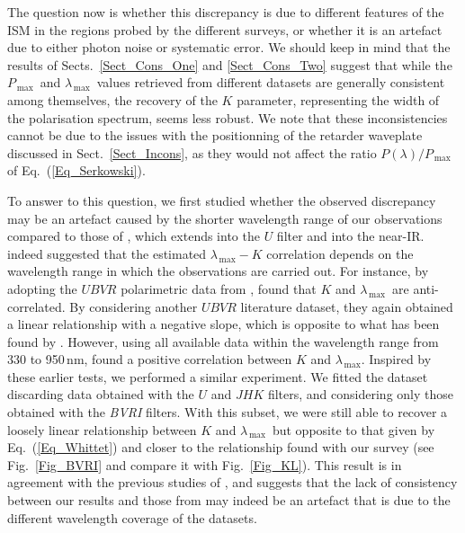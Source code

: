 \documentclass[a4paper]{aa}
\newcommand{\pl}{\ensuremath{P}}
\newcommand{\lmax}{\ensuremath{\lambda_\mathrm{\,max}}}
\newcommand{\pmax}{\ensuremath{P_\mathrm{\,max}}}
\begin{document}
The question now is whether this discrepancy is due to different
features of the ISM in the regions probed by the different surveys, or
whether it is an artefact due to either photon noise or systematic
error. We should keep in mind that the results of Sects.~\ref{Sect_Cons_One}
and \ref{Sect_Cons_Two} suggest that while the \pmax\ and
\lmax\ values retrieved from different datasets are generally
consistent among themselves, the recovery of the $K$ parameter,
representing the width of the polarisation spectrum, seems
less robust. We note that these inconsistencies cannot be due to the
issues with the positionning of the retarder waveplate discussed in
Sect.~\ref{Sect_Incons}, as they would not
affect the ratio $\pl(\lambda)/\pmax$ of Eq.~(\ref{Eq_Serkowski}).

To answer to this question, we first studied whether the observed
discrepancy may be an artefact caused by the shorter wavelength range of our observations compared to those of \citet{Whietal92}, which
extends into the $U$ filter and into the near-IR. 
\citet{ClaAlr83} indeed suggested that the estimated $\lmax-K$ correlation
depends on the wavelength range in which the observations are carried
out. For instance, by adopting the $UBVR$ polarimetric data from
\citet{Seretal75}, \citet{ClaAlr83} found that $K$ and \lmax\ are
anti-correlated. By considering another $UBVR$ literature dataset,
they again obtained a linear relationship with a negative slope, which is
opposite to what has been found by \citet{Wiletal80}. However, using all
available data within the wavelength range from 330 to 950\,nm,
\citet{ClaAlr83} found a positive correlation between $K$ and \lmax.
Inspired by these earlier tests, we performed a similar experiment. We fitted the \citet{Whietal92} dataset discarding data
obtained with the $U$ and $JHK$ filters, and considering only those
obtained with the {\it BVRI} filters. With this subset, we were still able to
recover a loosely linear relationship between $K$ and \lmax\, but
opposite to that given by Eq.~(\ref{Eq_Whittet}) and closer
to the relationship found with our survey (see Fig.~\ref{Fig_BVRI} and
compare it with Fig.~\ref{Fig_KL}).  This result is in agreement with
the previous studies of \citet{ClaAlr83}, and suggests that the lack
of consistency between our results and those from \citet{Whietal92}
may indeed be an artefact that is due to the different wavelength coverage of
the datasets.
\end{document}
